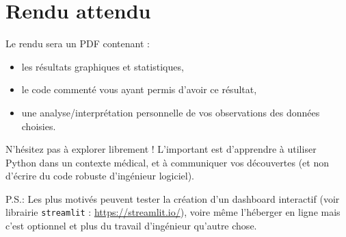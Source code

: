 \documentclass[12pt,a4paper]{article}
\begin{document}
\newpage
\section*{Rendu attendu}

Le rendu sera un PDF contenant :
\begin{itemize}
    \item les résultats graphiques et statistiques,
    \item le code commenté vous ayant permis d'avoir ce résultat,
    \item une analyse/interprétation personnelle de vos observations des données choisies.
\end{itemize}
N'hésitez pas à explorer librement ! L'important est d'apprendre à utiliser Python dans un contexte médical, et à communiquer vos découvertes (et non d'écrire du code robuste d'ingénieur logiciel).

P.S.: Les plus motivés peuvent tester la création d’un dashboard interactif (voir librairie \texttt{streamlit} : \href{https://streamlit.io/}{https://streamlit.io/}), voire même l'héberger en ligne mais c’est optionnel et plus du travail d'ingénieur qu'autre chose.
\end{document}
